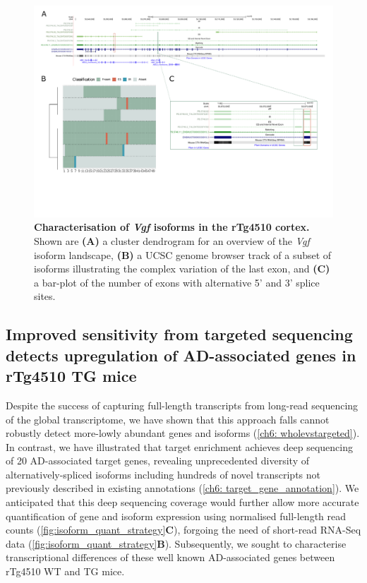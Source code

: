 \begin{landscape}
	\begin{figure}[htp]
		\centering
		\includegraphics[page=14,trim={0 3cm 0 0},scale = 0.85]{Figures/TargetGenes_Annotation_Landscape.pdf}
		\captionsetup{width=1.3\textwidth}
		\caption[Characterisation of the \textit{Vgf} isoform landscape]%
		{\textbf{Characterisation of \textit{Vgf} isoforms in the rTg4510 cortex.} Shown are \textbf{(A)} a cluster dendrogram for an overview of the \textit{Vgf} isoform landscape, \textbf{(B)} a UCSC genome browser track of a subset of isoforms illustrating the complex variation of the last exon, and \textbf{(C)} a bar-plot of the number of exons with alternative 5' and 3' splice sites.}   
		\label{fig:vgf}
	\end{figure}
\end{landscape}
\restoregeometry

\newpage
\subsection{Improved sensitivity from targeted sequencing detects upregulation of AD-associated genes in rTg4510 TG mice}
Despite the success of capturing full-length transcripts from long-read sequencing of the global transcriptome, we have shown that this approach falls cannot robustly detect more-lowly abundant genes and isoforms (\cref{ch6: wholevstargeted}). In contrast, we have illustrated that target enrichment achieves deep sequencing of 20 AD-associated target genes, revealing unprecedented diversity of alternatively-spliced isoforms including hundreds of novel transcripts not previously described in existing annotations (\cref{ch6: target_gene_annotation}). We anticipated that this deep sequencing coverage would further allow more accurate quantification of gene and isoform expression using normalised full-length read counts (\cref{fig:isoform_quant_strategy}\textbf{C}), forgoing the need of short-read RNA-Seq data (\cref{fig:isoform_quant_strategy}\textbf{B}). Subsequently, we sought to characterise transcriptional differences of these well known AD-associated genes between rTg4510 WT and TG mice.

